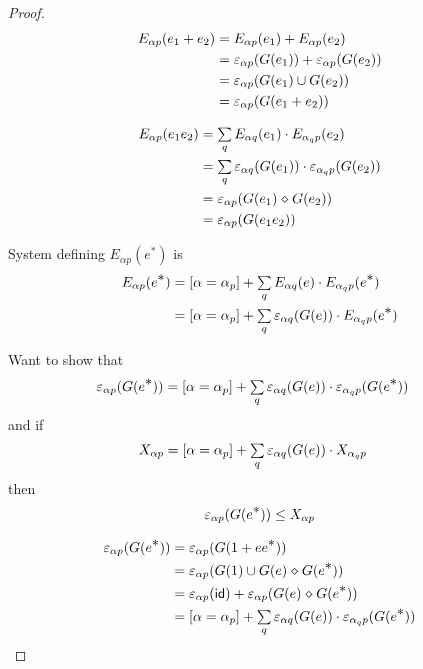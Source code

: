 \documentclass{article}
\renewcommand\smash{\mathrel{\diamond}}
\newcommand\ssum{\mathop{\textstyle\sum}}
\newcommand\bval[1]{[#1]}
\renewcommand\star{^{\textstyle *}}
\newcommand\id{\mathsf{id}}
\begin{document}
\begin{proof}
\begin{align*}
E_{\alpha p}(e_1+e_2)
&= E_{\alpha p}(e_1)+E_{\alpha p}(e_2)\\
&= \varepsilon_{\alpha p}(G(e_1)) + \varepsilon_{\alpha p}(G(e_2))\\
&= \varepsilon_{\alpha p}(G(e_1)\cup G(e_2))\\
&= \varepsilon_{\alpha p}(G(e_1+e_2))
\end{align*}

\begin{align*}
E_{\alpha p}(e_1e_2)
&= \ssum_{q} E_{\alpha q}(e_1)\cdot E_{\alpha_q p}(e_2)\\
&= \ssum_{q} \eps_{\alpha q}(G(e_1))\cdot \eps_{\alpha_q p}(G(e_2))\\
&= \eps_{\alpha p}(G(e_1)\smash G(e_2))\\
&= \eps_{\alpha p}(G(e_1e_2))
\end{align*}

System defining $E_{\alpha p}(e\star)$ is
\begin{align*}
E_{\alpha p}(e\star)
&= \bval{\alpha=\alpha_p} + \ssum_{q} E_{\alpha q}(e)\cdot E_{\alpha_q p}(e\star)\\
&= \bval{\alpha=\alpha_p} + \ssum_{q} \eps_{\alpha q}(G(e))\cdot E_{\alpha_q p}(e\star)
\end{align*}

Want to show that
\begin{align*}
\eps_{\alpha p}(G(e\star))
&= \bval{\alpha=\alpha_p} + \ssum_{q} \eps_{\alpha q}(G(e))\cdot \eps_{\alpha_q p}(G(e\star))
\end{align*}
and if
\begin{align*}
X_{\alpha p}
&= \bval{\alpha=\alpha_p} + \ssum_{q} \eps_{\alpha q}(G(e))\cdot X_{\alpha_q p}
\end{align*}
then
\begin{align*}
\eps_{\alpha p}(G(e\star)) \leq X_{\alpha p}
\end{align*}

\begin{align*}
\eps_{\alpha p}(G(e\star))
&= \eps_{\alpha p}(G(1 + ee\star))\\
&= \eps_{\alpha p}(G(1)\cup G(e)\smash G(e\star))\\
&= \eps_{\alpha p}(\id) + \eps_{\alpha p}(G(e)\smash G(e\star))\\
&= \bval{\alpha=\alpha_p} + \ssum_{q} \eps_{\alpha q}(G(e))\cdot \eps_{\alpha_q p}(G(e\star))
\end{align*}


\end{proof}
\end{document}
